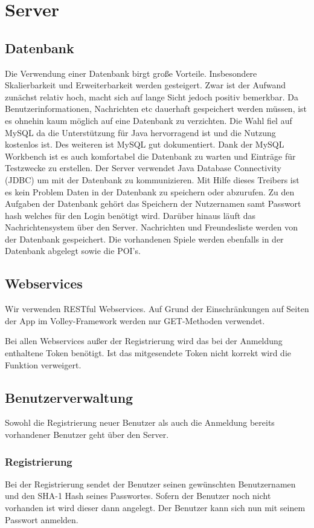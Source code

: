 \chapter{Server}
\section{Datenbank}
Die Verwendung einer Datenbank birgt große Vorteile. Insbesondere Skalierbarkeit und Erweiterbarkeit werden gesteigert. Zwar ist der Aufwand zunächst relativ hoch, macht sich auf lange Sicht jedoch positiv bemerkbar. Da Benutzerinformationen, Nachrichten etc dauerhaft gespeichert werden müssen, ist es ohnehin kaum möglich auf eine Datenbank zu verzichten. 
Die Wahl fiel auf MySQL da die Unterstützung für Java hervorragend ist und die Nutzung kostenlos ist. Des weiteren ist MySQL gut dokumentiert. Dank der MySQL Workbench ist es auch komfortabel die Datenbank zu warten und Einträge für Testzwecke zu erstellen.
Der Server verwendet Java Database Connectivity (JDBC) um mit der Datenbank zu kommunizieren. Mit Hilfe dieses Treibers ist es kein Problem Daten in der Datenbank zu speichern oder abzurufen.
Zu den Aufgaben der Datenbank gehört das Speichern der Nutzernamen samt Passwort hash welches für den Login benötigt wird. Darüber hinaus läuft das Nachrichtensystem über den Server. Nachrichten und Freundesliste werden von der Datenbank gespeichert. Die vorhandenen Spiele werden ebenfalls in der Datenbank abgelegt sowie die POI's.

\section{Webservices}
Wir verwenden RESTful Webservices. Auf Grund der Einschränkungen auf Seiten der App im Volley-Framework werden nur GET-Methoden verwendet. 

Bei allen Webservices außer der Registrierung wird das bei der Anmeldung enthaltene Token benötigt. Ist das mitgesendete Token nicht korrekt wird die Funktion verweigert.

\section{Benutzerverwaltung}
Sowohl die Registrierung neuer Benutzer als auch die Anmeldung bereits vorhandener Benutzer geht über den Server. 

\subsection{Registrierung}
Bei der Registrierung sendet der Benutzer seinen gewünschten Benutzernamen und den SHA-1 Hash seines Passwortes. Sofern der Benutzer noch nicht vorhanden ist wird dieser dann angelegt. Der Benutzer kann sich nun mit seinem Passwort anmelden.

